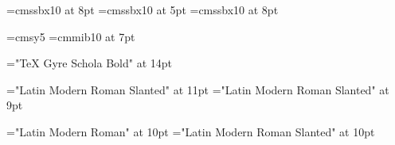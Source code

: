 



\newfam\ChordFam
\font\ChordFontText=cmssbx10 at 8pt
\font\ChordFontExp=cmssbx10 at 5pt
\font\ChordFontBass=cmssbx10 at 8pt

\font\ChordFontExpSymb=cmsy5
\font\ChordSymb=cmmib10 at 7pt

\font\SongNameFont="TeX Gyre Schola Bold" at 14pt

\font\AuthorFont="Latin Modern Roman Slanted" at 11pt
\font\CategoryFont="Latin Modern Roman Slanted" at 9pt

\newif\ifshowsourceref
\newif\ifshowcategory

\font\TextFont="Latin Modern Roman" at 10pt
\font\TextFontSlanted="Latin Modern Roman Slanted" at 10pt

\def\sl#1{\bgroup\leavevmode{\TextFontSlanted #1}\egroup}

